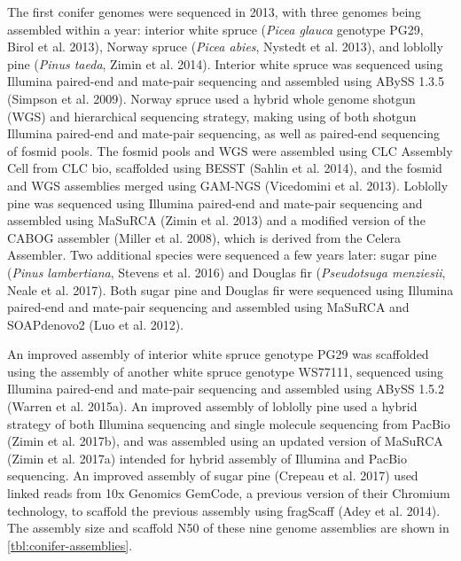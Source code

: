 \documentclass[
  12pt,
  oneside,
  openany]{book}
\begin{document}
The first conifer genomes were sequenced in 2013, with three genomes being assembled within a year: interior white spruce (\emph{Picea glauca} genotype PG29, Birol et al. 2013), Norway spruce (\emph{Picea abies}, Nystedt et al. 2013), and loblolly pine (\emph{Pinus taeda}, Zimin et al. 2014). Interior white spruce was sequenced using Illumina paired-end and mate-pair sequencing and assembled using ABySS 1.3.5 (Simpson et al. 2009). Norway spruce used a hybrid whole genome shotgun (WGS) and hierarchical sequencing strategy, making using of both shotgun Illumina paired-end and mate-pair sequencing, as well as paired-end sequencing of fosmid pools. The fosmid pools and WGS were assembled using CLC Assembly Cell from CLC bio, scaffolded using BESST (Sahlin et al. 2014), and the fosmid and WGS assemblies merged using GAM-NGS (Vicedomini et al. 2013). Loblolly pine was sequenced using Illumina paired-end and mate-pair sequencing and assembled using MaSuRCA (Zimin et al. 2013) and a modified version of the CABOG assembler (Miller et al. 2008), which is derived from the Celera Assembler. Two additional species were sequenced a few years later: sugar pine (\emph{Pinus lambertiana}, Stevens et al. 2016) and Douglas fir (\emph{Pseudotsuga menziesii}, Neale et al. 2017). Both sugar pine and Douglas fir were sequenced using Illumina paired-end and mate-pair sequencing and assembled using MaSuRCA and SOAPdenovo2 (Luo et al. 2012).

An improved assembly of interior white spruce genotype PG29 was scaffolded using the assembly of another white spruce genotype WS77111, sequenced using Illumina paired-end and mate-pair sequencing and assembled using ABySS 1.5.2 (Warren et al. 2015a). An improved assembly of loblolly pine used a hybrid strategy of both Illumina sequencing and single molecule sequencing from PacBio (Zimin et al. 2017b), and was assembled using an updated version of MaSuRCA (Zimin et al. 2017a) intended for hybrid assembly of Illumina and PacBio sequencing. An improved assembly of sugar pine (Crepeau et al. 2017) used linked reads from 10x Genomics GemCode, a previous version of their Chromium technology, to scaffold the previous assembly using fragScaff (Adey et al. 2014). The assembly size and scaffold N50 of these nine genome assemblies are shown in \cref{tbl:conifer-assemblies}.
\end{document}
